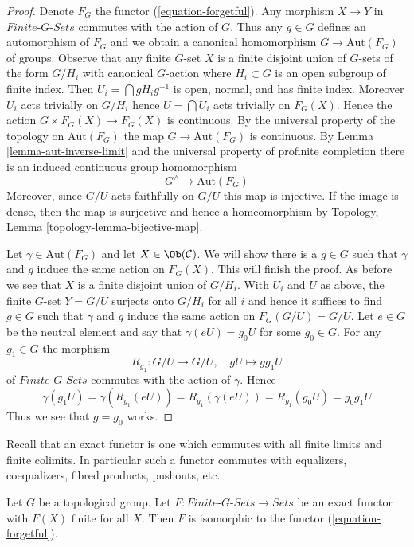 \begin{proof}
Denote $F_G$ the functor (\ref{equation-forgetful}). Any morphism
$X \to Y$ in $\textit{Finite-}G\textit{-Sets}$ commutes with the action
of $G$. Thus any $g \in G$ defines an automorphism of $F_G$ and
we obtain a canonical homomorphism $G \to \text{Aut}(F_G)$ of groups.
Observe that any finite $G$-set $X$ is a finite disjoint union of
$G$-sets of the form $G/H_i$ with canonical $G$-action where
$H_i \subset G$ is an open subgroup of finite index. Then
$U_i = \bigcap gH_ig^{-1}$ is open, normal, and has finite index.
Moreover $U_i$ acts trivially on $G/H_i$ hence
$U = \bigcap U_i$ acts trivially on $F_G(X)$. Hence the action
$G \times F_G(X) \to F_G(X)$ is continuous. By the universal
property of the topology on $\text{Aut}(F_G)$ the map
$G \to \text{Aut}(F_G)$ is continuous.
By Lemma \ref{lemma-aut-inverse-limit} and the universal property
of profinite completion there is an induced
continuous group homomorphism
$$
G^\wedge \longrightarrow \text{Aut}(F_G)
$$
Moreover, since $G/U$ acts faithfully on $G/U$ this map is
injective. If the image is dense, then the map is surjective and hence a
homeomorphism by Topology, Lemma \ref{topology-lemma-bijective-map}.

\medskip\noindent
Let $\gamma \in \text{Aut}(F_G)$ and let $X \in \Ob(\mathcal{C})$.
We will show there is a $g \in G$ such that $\gamma$ and $g$
induce the same action on $F_G(X)$. This will finish the proof.
As before we see that $X$ is a finite disjoint union of $G/H_i$.
With $U_i$ and $U$ as above, the finite $G$-set $Y = G/U$
surjects onto $G/H_i$ for all $i$ and hence it suffices to
find $g \in G$ such that $\gamma$ and $g$ induce the same action
on $F_G(G/U) = G/U$. Let $e \in G$ be the neutral element and
say that $\gamma(eU) = g_0U$ for some $g_0 \in G$. For any
$g_1 \in G$ the morphism
$$
R_{g_1} : G/U \longrightarrow G/U,\quad gU \longmapsto gg_1U
$$
of $\textit{Finite-}G\textit{-Sets}$ commutes with the action of
$\gamma$. Hence
$$
\gamma(g_1U) = \gamma(R_{g_1}(eU)) = R_{g_1}(\gamma(eU)) =
R_{g_1}(g_0U) = g_0g_1U
$$
Thus we see that $g = g_0$ works.
\end{proof}

\noindent
Recall that an exact functor is one which commutes with all
finite limits and finite colimits. In particular such a functor
commutes with equalizers, coequalizers, fibred products,
pushouts, etc.

\begin{lemma}
\label{lemma-second-fundamental-functor}
Let $G$ be a topological group. Let
$F : \textit{Finite-}G\textit{-Sets} \to \textit{Sets}$
be an exact functor with $F(X)$ finite for all $X$.
Then $F$ is isomorphic to the functor (\ref{equation-forgetful}).
\end{lemma}

